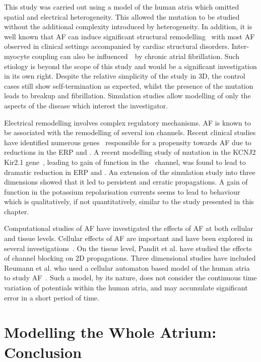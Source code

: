 This study was carried out using a model of the human atria which omitted
spatial and electrical heterogeneity.
This allowed the mutation to be studied without the additional complexity
introduced by heterogeneity.
In addition, it is well known that AF can induce significant structural
remodelling~\cite{Goette2002,Avitall2008} with most AF observed in clinical settings accompanied by cardiac
structural disorders.
Inter-myocyte coupling can also be influenced~\cite{Velden1998}\ by chronic
atrial fibrillation.
Such etiology is beyond the scope of this study and would be a significant
investigation in its own right.
Despite the relative simplicity of the study in 3D, the control cases still show
self-termination as expected, whilst the presence of the mutation leads to
breakup and fibrillation.
Simulation studies allow modelling of only the aspects of the disease which
interest the investigator.

Electrical remodelling involves complex regulatory mechanisms.
AF is known to be associated with the remodelling of several ion channels.
Recent clinical studies have identified numerous
genes~\cite{Otway2007,Xia2005,Yang2004,Restier2008,Hong2005,Ravens2008,Yang1997a,Olson2005a} responsible for a
propensity towards AF due to reductions in the ERP and \apd.
A recent modelling study of mutation in the KCNJ2 Kir2.1 gene~\cite{Kharche2008}, leading to gain
of function in the \ channel, was found to lead to dramatic reduction in
ERP and \apd.
An extension of the simulation study into three dimensions showed that it led to
persistent and erratic propagations.
A gain of function in the potassium repolarisation currents seems to lead to
behaviour which is qualitatively, if not quantitatively, similar to the study
presented in this chapter.

Computational studies of AF have investigated the effects of AF at both cellular
and tissue levels.
Cellular effects of AF are important and have been explored in several
investigations~\cite{Zhang2005,Workman2001,Bosch2003}.
On the tissue level, Pandit et al. have studied the effects of channel blocking
on 2D propagations\cite{Pandit2005}.
Three dimensional studies have included Reumann et al. who used a cellular
automaton based model of the human atria to study AF~\cite{Reumann2007}.
Such a model, by its nature, does not consider the continuous time variation of
potentials within the human atria, and may accumulate significant error in a
short period of time.

\section{Modelling the Whole Atrium: Conclusion}

